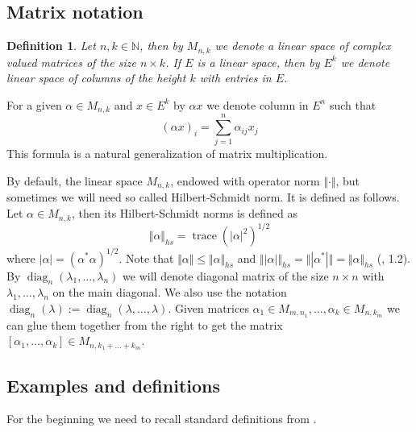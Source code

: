 \documentclass[12pt]{article}
\newtheorem{definition}[theorem]{Definition}
\begin{document}
\subsection {Matrix notation}

\begin{definition}\label{DefMatrNot}
Let $n,k\in\mathbb{N}$, then by $M_{n,k}$ we denote a linear space of complex valued matrices of the size $n\times k$. If $E$ is a linear space, then by $E^k$ we denote linear space of columns of the height $k$ with entries in $E$.
\end{definition}

For a given $\alpha\in M_{n,k}$ and $x\in E^k$ by $\alpha x$ we denote column in $E^n$ such that
$$
(\alpha x)_i=\sum\limits_{j=1}^n \alpha_{ij} x_j
$$
This formula is a natural generalization of matrix multiplication.

By default, the linear space $M_{n,k}$, endowed with operator norm $\Vert\cdot\Vert$, but sometimes we will need so called Hilbert-Schmidt norm. It is defined as follows. Let $\alpha\in M_{n,k}$, then its Hilbert-Schmidt norms is defined as
$$
\Vert\alpha\Vert_{hs}=\operatorname{trace}(|\alpha|^2)^{1/2}
$$
where $|\alpha|=(\alpha^*\alpha)^{1/2}$. Note that $\Vert\alpha\Vert\leq\Vert\alpha\Vert_{hs}$ and $\Vert|\alpha|\Vert_{hs}=\Vert|\alpha^*|\Vert=\Vert\alpha\Vert_{hs}$ (\cite{EROpSp}, 1.2).
By $\operatorname{diag}_n(\lambda_1,\ldots,\lambda_n)$  we will denote diagonal matrix of the size $n\times n$ with $\lambda_1,\ldots,\lambda_n$ on the main diagonal. We also use the notation $\operatorname{diag}_n(\lambda):=\operatorname{diag}_n(\lambda,\ldots,\lambda)$. Given matrices $\alpha_1\in M_{m,n_1},\ldots,\alpha_k\in M_{n,k_m}$ we can glue them together from the right to get the matrix $[\alpha_1,\ldots,\alpha_k]\in M_{n,k_1+\ldots+k_m}$.





























\subsection{Examples and definitions} 
For the beginning we need to recall standard definitions from \cite{LamOpFolgen}.
\end{document}
